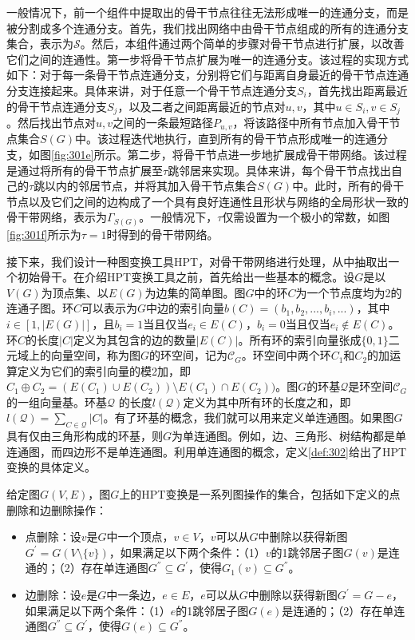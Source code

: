 一般情况下，前一个组件中提取出的骨干节点往往无法形成唯一的连通分支，而是被分割成多个连通分支。首先，我们找出网络中由骨干节点组成的所有的连通分支集合，表示为$\mathcal{S}$。然后，本组件通过两个简单的步骤对骨干节点进行扩展，以改善它们之间的连通性。第一步将骨干节点扩展为唯一的连通分支。该过程的实现方式如下：对于每一条骨干节点连通分支，分别将它们与距离自身最近的骨干节点连通分支连接起来。具体来讲，对于任意一个骨干节点连通分支$S_i$，首先找出距离最近的骨干节点连通分支$S_j$，以及二者之间距离最近的节点对$u,v$，其中$u\in{S_i},v\in{S_j}$。然后找出节点对$u,v$之间的一条最短路径$P_{u,v}$，将该路径中所有节点加入骨干节点集合$S(G)$中。该过程迭代地执行，直到所有的骨干节点形成唯一的连通分支，如图\ref{fig:301e}所示。第二步，将骨干节点进一步地扩展成骨干带网络。该过程是通过将所有的骨干节点扩展至$\tau$跳邻居来实现。具体来讲，每个骨干节点找出自己的$\tau$跳以内的邻居节点，并将其加入骨干节点集合$S(G)$中。此时，所有的骨干节点以及它们之间的边构成了一个具有良好连通性且形状与网络的全局形状一致的骨干带网络，表示为$\Gamma_{S(G)}$。一般情况下，$\tau$仅需设置为一个极小的常数，如图\ref{fig:301f}所示为$\tau=1$时得到的骨干带网络。

接下来，我们设计一种图变换工具HPT，对骨干带网络进行处理，从中抽取出一个初始骨干。在介绍HPT变换工具之前，首先给出一些基本的概念。设$G$是以$V(G)$为顶点集、以$E(G)$为边集的简单图。图$G$中的环$C$为一个节点度均为2的连通子图。环$C$可以表示为$G$中边的索引向量$b(C)=(b_1,b_2,...,b_i,...)$，其中$i\in{[1,|E(G)|]}$，且$b_i=1$当且仅当$e_i\in{E(C)}$，$b_i=0$当且仅当$e_i\notin{E(C)}$。环$C$的长度$|C|$定义为其包含的边的数量$|E(C)|$。所有环的索引向量张成$\{0,1\}$二元域上的向量空间，称为图$G$的环空间，记为$\mathcal{C}_G$。环空间中两个环$C_1$和$C_2$的加运算定义为它们的索引向量的模2加，即$C_1\oplus{C_2}=(E(C_1)\cup{E(C_2)})\setminus{E(C_1)\cap{E(C_2)})}$。图$G$的环基$\mathcal{Q}$是环空间$\mathcal{C}_G$的一组向量基。环基$\mathcal{Q}$ 的长度$l(\mathcal{Q})$定义为其中所有环的长度之和，即$l(\mathcal{Q})=\sum_{C\in{\mathcal{Q}}}|C|$。有了环基的概念，我们就可以用来定义单连通图。如果图$G$具有仅由三角形构成的环基，则$G$为单连通图。例如，边、三角形、树结构都是单连通图，而四边形不是单连通图。利用单连通图的概念，定义\ref{def:302}给出了HPT变换的具体定义。
\begin{definition}\label{def:302}
给定图$G(V,E)$，图$G$上的HPT变换是一系列图操作的集合，包括如下定义的点删除和边删除操作：
\begin{itemize}
\item 点删除：设$v$是$G$中一个顶点，$v\in{V}$，$v$可以从$G$中删除以获得新图$G^{'}=G(V\setminus\{v\})$，如果满足以下两个条件：（1）$v$的1跳邻居子图$G(v)$是连通的；（2）存在单连通图$G^{''}\subseteq{G^{'}}$，使得$G_1(v)\subseteq{G^{''}}$。
\item 边删除：设$e$是$G$中一条边，$e\in{E}$，$e$可以从$G$中删除以获得新图$G^{'}=G-e$，如果满足以下两个条件：（1）$e$的1跳邻居子图$G(e)$是连通的；（2）存在单连通图$G^{''}\subseteq{G^{'}}$，使得$G(e)\subseteq{G^{''}}$。
\end{itemize}
\end{definition}

